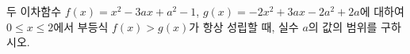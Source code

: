 두 이차함수 $f(x)=x^2-3ax+a^2-1$, $g(x)=-2x^2+3ax-2a^2+2a$에 대하여 $0\le x\le 2$에서 부등식 $f(x)>g(x)$가 항상 성립할 때, 실수 $a$의 값의 범위를 구하시오.
